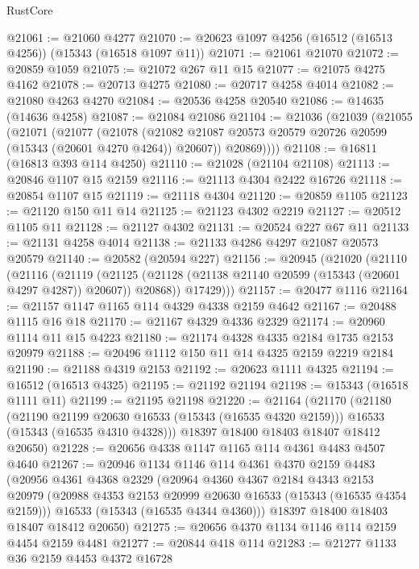 \begin{lexlean}{RustCore}
\begin{coremodule}
@21061 := @21060 @4277
@21070 := @20623 @1097 @4256 (@16512 (@16513 @4256)) (@15343 (@16518 @1097 @11))
@21071 := @21061 @21070
@21072 := @20859 @1059
@21075 := @21072 @267 @11 @15
@21077 := @21075 @4275 @4162
@21078 := @20713 @4275
@21080 := @20717 @4258 @4014
@21082 := @21080 @4263 @4270
@21084 := @20536 @4258 @20540
@21086 := @14635 (@14636 @4258)
@21087 := @21084 @21086
@21104 := @21036
    (@21039
      (@21055
        (@21071
          (@21077
            (@21078
              (@21082 @21087 @20573 @20579 @20726 @20599 (@15343 (@20601 @4270 @4264)) @20607))
            @20869))))
@21108 := @16811 (@16813 @393 @114 @4250)
@21110 := @21028 (@21104 @21108)
@21113 := @20846 @1107 @15 @2159
@21116 := @21113 @4304 @2422 @16726
@21118 := @20854 @1107 @15
@21119 := @21118 @4304
@21120 := @20859 @1105
@21123 := @21120 @150 @11 @14
@21125 := @21123 @4302 @2219
@21127 := @20512 @1105 @11
@21128 := @21127 @4302
@21131 := @20524 @227 @67 @11
@21133 := @21131 @4258 @4014
@21138 := @21133 @4286 @4297 @21087 @20573 @20579
@21140 := @20582 (@20594 @227)
@21156 := @20945
    (@21020
      (@21110
        (@21116
          (@21119
            (@21125 (@21128 (@21138 @21140 @20599 (@15343 (@20601 @4297 @4287)) @20607)) @20868))
          @17429)))
@21157 := @20477 @1116
@21164 := @21157 @1147 @1165 @114 @4329 @4338 @2159 @4642
@21167 := @20488 @1115 @16 @18
@21170 := @21167 @4329 @4336 @2329
@21174 := @20960 @1114 @11 @15 @4223
@21180 := @21174 @4328 @4335 @2184 @1735 @2153 @20979
@21188 := @20496 @1112 @150 @11 @14 @4325 @2159 @2219 @2184
@21190 := @21188 @4319 @2153
@21192 := @20623 @1111 @4325
@21194 := @16512 (@16513 @4325)
@21195 := @21192 @21194
@21198 := @15343 (@16518 @1111 @11)
@21199 := @21195 @21198
@21220 := @21164
    (@21170
      (@21180
        (@21190 @21199 @20630 @16533 (@15343 (@16535 @4320 @2159)))
        @16533
        (@15343 (@16535 @4310 @4328)))
      @18397
      @18400
      @18403
      @18407
      @18412
      @20650)
@21228 := @20656 @4338 @1147 @1165 @114 @4361 @4483 @4507 @4640
@21267 := @20946
    @1134
    @1146
    @114
    @4361
    @4370
    @2159
    @4483
    (@20956
      @4361
      @4368
      @2329
      (@20964
        @4360
        @4367
        @2184
        @4343
        @2153
        @20979
        (@20988 @4353 @2153 @20999 @20630 @16533 (@15343 (@16535 @4354 @2159)))
        @16533
        (@15343 (@16535 @4344 @4360)))
      @18397
      @18400
      @18403
      @18407
      @18412
      @20650)
@21275 := @20656 @4370 @1134 @1146 @114 @2159 @4454 @2159 @4481
@21277 := @20844 @418 @114
@21283 := @21277 @1133 @36 @2159 @4453 @4372 @16728

\end{coremodule}
\end{lexlean}
